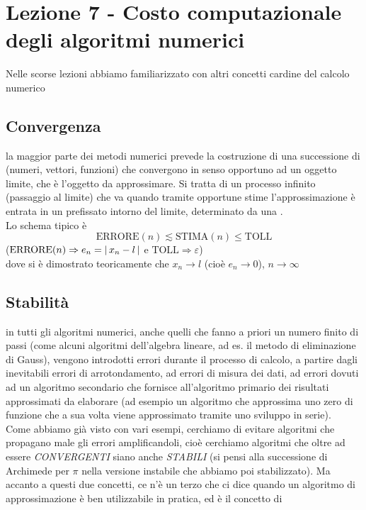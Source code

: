 \documentclass[12pt]{article}
\DeclarePairedDelimiter{\abs}{\lvert}{\rvert}
\begin{document}
\section{Lezione 7 - Costo computazionale degli algoritmi numerici}
Nelle scorse lezioni abbiamo familiarizzato con altri concetti cardine del calcolo numerico 

\subsection{Convergenza}
la maggior parte dei metodi numerici prevede la costruzione di una successione di  (numeri, vettori, funzioni) che convergono in senso opportuno ad un oggetto limite, che è l'oggetto da approssimare. Si tratta di un processo infinito (passaggio al limite) che va  quando tramite opportune stime l'approssimazione è entrata in un prefissato intorno del limite, determinato da una .\\
Lo schema tipico è 
\[ \text{ERRORE}(n) \lesssim \text{STIMA}(n) \le \text{TOLL} \]
($\text{ERRORE}(n) \Rightarrow e_n = \abs{\,x_n-l\,}$ e $\text{TOLL} \Rightarrow\varepsilon$)\\
dove si è dimostrato teoricamente che $x_n\to l$ (cioè $e_n\to0$), $n\to\infty$ 

\subsection{Stabilità}
in tutti gli algoritmi numerici, anche quelli che fanno a priori un numero finito di passi (come alcuni algoritmi dell'algebra lineare, ad es. il metodo di eliminazione di Gauss), vengono introdotti errori durante il processo di calcolo, a partire dagli inevitabili errori di arrotondamento, ad errori di misura dei dati, ad errori dovuti ad un algoritmo secondario che fornisce all'algoritmo primario dei risultati approssimati da elaborare (ad esempio un algoritmo che approssima uno zero di funzione che a sua volta viene approssimato tramite uno sviluppo in serie).\\
Come abbiamo già visto con vari esempi, cerchiamo di evitare algoritmi che propagano male gli errori amplificandoli, cioè cerchiamo algoritmi che oltre ad essere \textit{CONVERGENTI} siano anche \textit{STABILI} (si pensi alla successione di Archimede per $\pi$ nella versione instabile che abbiamo poi stabilizzato).
\newline \newline
Ma accanto a questi due concetti, ce n'è un terzo che ci dice quando un algoritmo di approssimazione è ben utilizzabile in pratica, ed è il concetto di
\end{document}
